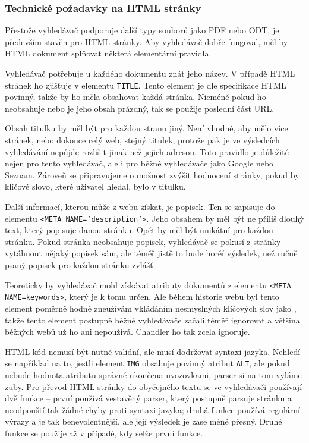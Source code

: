 \documentclass[12pt]{article}
\newcommand{\name}{Chandler}
\newcommand{\code}[1]{\texttt{#1}}
\newcommand{\sssection}[1]{\subsubsection{#1}}
\begin{document}
\sssection{Technické požadavky na HTML stránky}
Přestože vyhledávač podporuje další typy souborů jako PDF nebo ODT, je především stavěn pro HTML stránky. Aby vyhledávač dobře fungoval, měl by HTML dokument splňovat některá elementární pravidla. 

Vyhledávač potřebuje u každého dokumentu znát jeho název. V případě HTML stránek ho zjišťuje v elementu \code{TITLE}. Tento element je dle specifikace HTML povinný, takže by ho měla obsahovat každá stránka. Nicméně pokud ho neobsahuje nebo je jeho obsah prázdný, tak se použije poslední část URL. 

Obsah titulku by měl být pro každou stranu jiný. Není vhodné, aby mělo více stránek, nebo dokonce celý web, stejný titulek, protože pak je ve výsledcích vyhledávání nepůjde rozlišit jinak než jejich adresou. Toto pravidlo je důležité nejen pro tento vyhledávač, ale i pro běžné vyhledávače jako Google nebo Seznam. Zároveň se připravujeme o možnost zvýšit hodnocení stránky, pokud by klíčové slovo, které uživatel hledal, bylo v titulku. 

Další informací, kterou může z webu získat, je popisek. Ten se zapisuje do elementu \code{<META NAME='description'>}. Jeho obsahem by měl být ne příliš dlouhý text, který popisuje danou stránku. Opět by měl být unikátní pro každou stránku. Pokud stránka neobsahuje popisek, vyhledávač se pokusí z stránky vytáhnout nějaký popisek sám, ale téměř jistě to bude horěí výsledek, než ručně psaný popisek pro každou stránku zvlášť. 

Teoreticky by vyhledávač mohl získávat atributy dokumentů z elementu \code{<META NAME=keywords>}, který je k tomu určen. Ale během historie webu byl tento element poměrně hodně zneužívám vkládáním nesmyslných klíčových slov jako , takže tento element postupně běžné vyhledávače začali téměř ignorovat a většina běžných webů už ho ani nepoužívá. \name{} ho tak zcela ignoruje. 

HTML kód nemusí být nutně validní, ale musí dodržovat syntaxi jazyka. Nehledí se například na to, jestli element \code{IMG} obsahuje povinný atribut \code{ALT}, ale pokud nebude hodnota atributu správně ukončena uvozovkami, parser si na tom vyláme zuby. Pro převod HTML stránky do obyčejného textu se ve vyhledávači používají dvě funkce -- první používá vestavěný parser, který postupně parsuje stránku a neodpouští tak žádné chyby proti syntaxi jazyka; druhá funkce používá regulární výrazy a je tak benevolentnější, ale její výsledek je zase méně přesný. Druhé funkce se použije až v případě, kdy selže první funkce.
\end{document}
